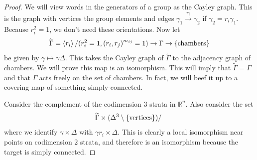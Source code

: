 \documentclass[leqno, openany]{memoir}
\theoremstyle{definition}
\theoremstyle{remark}
\theoremstyle{plain}
\theoremstyle{definition}
\theoremstyle{remark}
\newcommand{\R}{\mathbb{R}}
\newcommand{\wtl}[1]{\widetilde{#1}}
\begin{document}
\begin{proof}
    We will view words in the generators of a group as the Cayley graph. This is the graph with vertices the group elements and edges $\gamma_1 \xrightarrow{r_i} \gamma_2$ if $\gamma_2 = r_i \gamma_1$. Because $r_i^2 = 1$, we don't need these orientations. Now let
    \[ \wtl{\Gamma} = \ev{r_i} / (r_i^2 = 1, {(r_i, r_j)}^{m_{ij}} = 1) \to \Gamma \to \qty{\text{chambers}} \]
    be given by $\gamma \mapsto \gamma \Delta$. This takes the Cayley graph of $\wtl{\Gamma}$ to the adjacency graph of chambers. We will prove this map is an isomorphism. This will imply that $\wtl{\Gamma} = \Gamma$ and that $\Gamma$ acts freely on the set of chambers. In fact, we will beef it up to a covering map of something simply-connected.

    Consider the complement of the codimension $3$ strata in $\R^n$. Also consider the set 
    \[ \wtl{\Gamma} \times (\Delta^3 \setminus \qty{\text{vertices}}) / ~ \]
    where we identify $\gamma \times \Delta$ with $\gamma r_i \times \Delta$. This is clearly a local isomorphism near points on codimension $2$ strata, and therefore is an isomorphism because the target is simply connected.
\end{proof}
\end{document}
